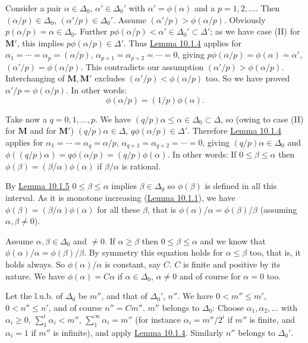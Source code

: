 \documentclass[12pt,b5paper,twoside]{article}
\newcommand{\M}{\mathbf M}
\newcommand{\lemref}[1]{\hyperref[lem:#1]{Lemma #1}}
\begin{document}
Consider a pair $\alpha\in\Delta_0$, $\alpha'\in\Delta_0'$ with
$\alpha'=\phi(\alpha)$ and a $p=1,2,\ldots$. Then
$(\alpha/p)\in\Delta_0$, $(\alpha'/p)\in\Delta_0'$. Assume
$(\alpha'/p)>\phi(\alpha/p)$. Obviously
$p(\alpha/p)=\alpha\in\Delta_0$. Further
$p\phi(\alpha/p)<\alpha'\in\Delta_0'\subset\Delta'$; as we have case (II)
for $\M'$, this implies $p\phi(\alpha/p)\in\Delta'$. Thus
\lemref{10.1.4} applies for
$\alpha_1=\cdots=\alpha_p=(\alpha/p)$,
$\alpha_{p+1}=\alpha_{p+2}=\cdots=0$, giving
$p\phi(\alpha/p)=\phi(\alpha)=\alpha'$, $(\alpha'/p)=\phi(\alpha/p)$.
This contradicts our assumption $(\alpha'/p)>\phi(\alpha/p)$.
Interchanging of $\M,\M'$ excludes
$(\alpha'/p)<\phi(\alpha/p)$ too. So we have proved
$\alpha'/p=\phi(\alpha/p)$. In other words:
\[
 \phi(\alpha/p)=(1/p)\phi(\alpha).
\]

Take now a $q=0,1,\ldots,p$. We have
$(q/p)\alpha\leq\alpha\in\Delta_0\subset\Delta$, so (owing to case (II)
for $\M$ and for $\M'$) $(q/p)\alpha\in\Delta$,
$q\phi(\alpha/p)\in\Delta'$. Therefore \lemref{10.1.4} applies for
$\alpha_1=\cdots=\alpha_q=\alpha/p$,
$\alpha_{q+1}=\alpha_{q+2}=\cdots=0$, giving
$(q/p)\alpha\in\Delta_0$ and
$\phi((q/p)\alpha)=q\phi(\alpha/p)=(q/p)\phi(\alpha)$. In other words: If
$0\leq\beta\leq\alpha$ then
$\phi(\beta)=(\beta/\alpha)\phi(\alpha)$ if $\beta/\alpha$ is rational.

By \lemref{10.1.5} $0\leq\beta\leq\alpha$ implies
$\beta\in\Delta_0$ so $\phi(\beta)$ is defined in all this interval. As it
is monotone increasing (\lemref{10.1.1}), we have
$\phi(\beta)=(\beta/\alpha)\phi(\alpha)$ for all these $\beta$, that is
$\phi(\alpha)/\alpha=\phi(\beta)/\beta$ (assuming
$\alpha,\beta\ne0$).

Assume $\alpha,\beta\in\Delta_0$ and $\ne0$. If $\alpha\geq\beta$ then
$0\leq\beta\leq\alpha$ and we know that
$\phi(\alpha)/\alpha=\phi(\beta)/\beta$. By symmetry this equation holds
for $\alpha\leq\beta$ too, that is, it holds always. So
$\phi(\alpha)/\alpha$ is constant, say $C$. $C$ is finite and positive by
its nature. We have $\phi(\alpha)=C\alpha$ if
$\alpha\in\Delta_0$, $\alpha\ne0$ and of course for $\alpha=0$ too.

Let the l.u.b. of $\Delta_0$ be $m''$, and that of $\Delta_0'$, $n''$. We
have $0<m''\leq m'$, $0<n''\leq n'$, and of course $n''=Cm''$.
$m''$ belongs to $\Delta_0$: Choose $\alpha_1,\alpha_2,\ldots$ with
$\alpha_i\geq0$, $\sum_1^i\alpha_i<m''$,
$\sum_{1}^{\infty}\alpha_i=m''$ (for instance
$\alpha_i=m''/2^i$ if $m''$ is finite, and $\alpha_i=1$ if $m''$ is
infinite), and apply \lemref{10.1.4}. Similarly $n''$ belongs to
$\Delta_0'$.
\end{document}
